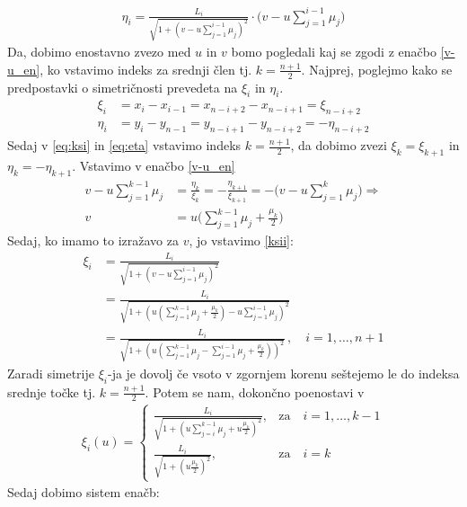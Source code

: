 \documentclass[a4paper,12pt]{article}
\begin{document}
\begin{align}
    \eta_i = \frac{L_i}{\sqrt{1 + (v - u \sum_{j=1}^{i-1}\mu_j)^2}}\cdot \Big(v - u \sum_{j=1}^{i-1}\mu_j\Big) 
\end{align}
Da, dobimo enostavno zvezo med $u$ in $v$ bomo pogledali kaj se zgodi z enačbo
\ref{v-u_en}, ko vstavimo indeks za srednji člen tj. $k = \frac{n+1}{2}$.
Najprej, poglejmo kako se predpostavki o simetričnosti prevedeta na $\xi_i$ in $\eta_i$.
\begin{align}
    \xi_i &= x_i - x_{i-1} = x_{n-i+2} - x_{n-i+1} = \xi_{n-i+2} \label{eq:ksi}\\
    \eta_i &= y_i - y_{n-1} = y_{n-i+1} - y_{n-i+2} = - \eta_{n-i+2}
    \label{eq:eta}
\end{align}
Sedaj v \ref{eq:ksi} in \ref{eq:eta} vstavimo indeks $k = \frac{n+1}{2}$, da dobimo zvezi $\xi_k = \xi_{k+1}$ in $\eta_k = - \eta_{k+1}$. Vstavimo v enačbo
\ref{v-u_en}
\begin{align*}
    v - u \sum_{j=1}^{k-1}\mu_j &= \frac{\eta_k}{\xi_k} = - \frac{\eta_{k+1}}{\xi_{k+1}} = - \Big(v - u \sum_{j=1}^{k}\mu_j\Big) \Rightarrow \\
    v &= u\Big( \sum_{j=1}^{k-1}\mu_j + \frac{\mu_k}{2} \Big)
\end{align*}
Sedaj, ko imamo to izražavo za $v$, jo vstavimo \ref{ksii}:
\begin{align*}
    \xi_i &= \frac{L_i}{\sqrt{1 + (v - u \sum_{j=1}^{i-1}\mu_j)^2}} \\
            &= \frac{L_i}{\sqrt{1 + (u (\sum_{j=1}^{k-1}\mu_j + \frac{\mu_k}{2})- u \sum_{j=1}^{i-1}\mu_j)^2}} \\
            &= \frac{L_i}{\sqrt{1 + (u(\sum_{j=1}^{k-1}\mu_j - \sum_{j=1}^{i-1}\mu_j + \frac{\mu_k}{2}))^2}} \, , \quad  i = 1,\dots,n+1
\end{align*}
Zaradi simetrije $\xi_i$-ja je dovolj če vsoto v zgornjem korenu seštejemo le do 
indeksa srednje točke tj. $k = \frac{n+1}{2}$. Potem se nam, dokončno poenostavi v 
\begin{align*}
    \xi_i(u) =  
    \begin{cases}
        \frac{L_i}{\sqrt{1 + (u\sum_{j=i}^{k-1}\mu_j + u\frac{\mu_k}{2})^2}}, &\text{za} \quad i = 1,\dots,k-1 \\
        \frac{L_i}{\sqrt{1 + (u\frac{\mu_k}{2})^2}}, &\text{za} \quad i = k
    \end{cases} 
\end{align*}
Sedaj dobimo sistem enačb:
\end{document}
